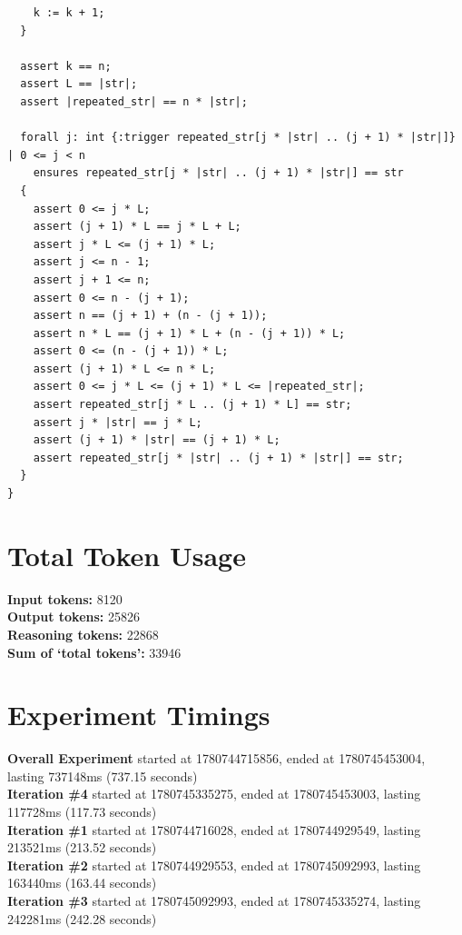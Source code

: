 \documentclass{article}
\begin{document}
\begin{lstlisting}
    k := k + 1;
  }

  assert k == n;
  assert L == |str|;
  assert |repeated_str| == n * |str|;

  forall j: int {:trigger repeated_str[j * |str| .. (j + 1) * |str|]} | 0 <= j < n
    ensures repeated_str[j * |str| .. (j + 1) * |str|] == str
  {
    assert 0 <= j * L;
    assert (j + 1) * L == j * L + L;
    assert j * L <= (j + 1) * L;
    assert j <= n - 1;
    assert j + 1 <= n;
    assert 0 <= n - (j + 1);
    assert n == (j + 1) + (n - (j + 1));
    assert n * L == (j + 1) * L + (n - (j + 1)) * L;
    assert 0 <= (n - (j + 1)) * L;
    assert (j + 1) * L <= n * L;
    assert 0 <= j * L <= (j + 1) * L <= |repeated_str|;
    assert repeated_str[j * L .. (j + 1) * L] == str;
    assert j * |str| == j * L;
    assert (j + 1) * |str| == (j + 1) * L;
    assert repeated_str[j * |str| .. (j + 1) * |str|] == str;
  }
}
\end{lstlisting}
\section*{Total Token Usage}
\textbf{Input tokens: }8120
\\\textbf{Output tokens: }25826
\\\textbf{Reasoning tokens: }22868
\\\textbf{Sum of `total tokens': }33946
\section*{Experiment Timings}
\textbf{Overall Experiment} started at 1780744715856, ended at 1780745453004, lasting 737148ms (737.15 seconds)
\\\textbf{Iteration \#4} started at 1780745335275, ended at 1780745453003, lasting 117728ms (117.73 seconds)
\\\textbf{Iteration \#1} started at 1780744716028, ended at 1780744929549, lasting 213521ms (213.52 seconds)
\\\textbf{Iteration \#2} started at 1780744929553, ended at 1780745092993, lasting 163440ms (163.44 seconds)
\\\textbf{Iteration \#3} started at 1780745092993, ended at 1780745335274, lasting 242281ms (242.28 seconds)
\end{document}
